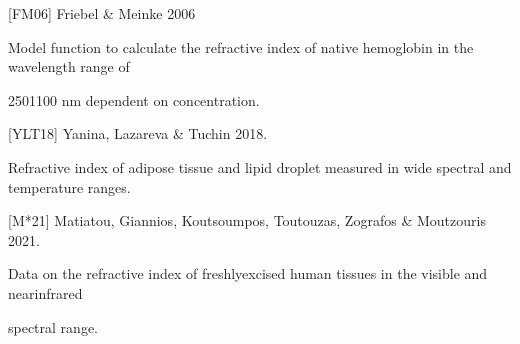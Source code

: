 \documentclass[letterpaper,10pt,english]{sphinxmanual}
\begin{document}
\begin{DUlineblock}{0em}
\item[] {[}FM06{]} Friebel \& Meinke 2006
\item[] Model function to calculate the refractive index of native hemoglobin in the wavelength range of
\item[] 250\textendash{}1100 nm dependent on concentration.
\item[] 
\end{DUlineblock}

\begin{DUlineblock}{0em}
\item[] {[}YLT18{]} Yanina, Lazareva \& Tuchin 2018.
\item[] Refractive index of adipose tissue and lipid droplet measured in wide spectral and temperature ranges.
\item[] 
\end{DUlineblock}

\begin{DUlineblock}{0em}
\item[] {[}M*21{]} Matiatou, Giannios, Koutsoumpos, Toutouzas, Zografos \& Moutzouris 2021.
\item[] Data on the refractive index of freshly\sphinxhyphen{}excised human tissues in the visible and near\sphinxhyphen{}infrared
\item[] spectral range.
\item[] 
\end{DUlineblock}
\end{document}
